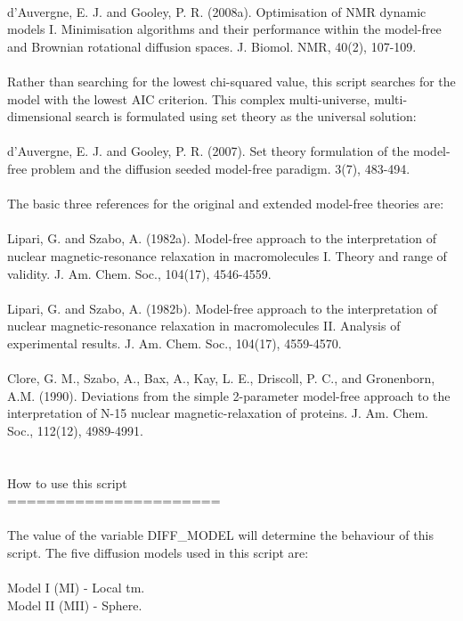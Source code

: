 \begin{htmlonly}
\begin{htmlonly}
\begin{exampleenv}
 \\
    d'Auvergne, E. J. and Gooley, P. R. (2008a). Optimisation of NMR dynamic models I. Minimisation algorithms and their performance within the model-free and Brownian rotational diffusion spaces. J. Biomol. NMR, 40(2), 107-109. \\
 \\
Rather than searching for the lowest chi-squared value, this script searches for the model with the lowest AIC criterion.  This complex multi-universe, multi-dimensional search is formulated using set theory as the universal solution: \\
 \\
    d'Auvergne, E. J. and Gooley, P. R. (2007). Set theory formulation of the model-free problem and the diffusion seeded model-free paradigm. 3(7), 483-494. \\
 \\
The basic three references for the original and extended model-free theories are: \\
 \\
    Lipari, G. and Szabo, A. (1982a). Model-free approach to the interpretation of nuclear magnetic-resonance relaxation in macromolecules I. Theory and range of validity. J. Am. Chem. Soc., 104(17), 4546-4559. \\
 \\
    Lipari, G. and Szabo, A. (1982b). Model-free approach to the interpretation of nuclear magnetic-resonance relaxation in macromolecules II. Analysis of experimental results. J. Am. Chem. Soc., 104(17), 4559-4570. \\
 \\
    Clore, G. M., Szabo, A., Bax, A., Kay, L. E., Driscoll, P. C., and Gronenborn, A.M. (1990). Deviations from the simple 2-parameter model-free approach to the interpretation of N-15 nuclear magnetic-relaxation of proteins. J. Am. Chem. Soc., 112(12), 4989-4991. \\
 \\
 \\
How to use this script \\
====================== \\
 \\
The value of the variable DIFF\_MODEL will determine the behaviour of this script.  The five diffusion models used in this script are: \\
 \\
    Model I   (MI)   - Local tm. \\
    Model II  (MII)  - Sphere. \\

\end{exampleenv}
\end{htmlonly}
\end{htmlonly}
